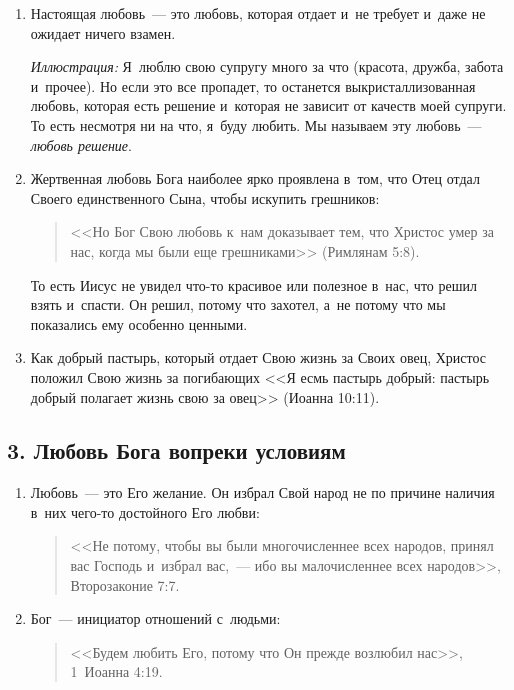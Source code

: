 \documentclass[a4paper,12pt]{article}
\begin{document}
\begin{enumerate}
    \item Настоящая любовь~--- это любовь, которая отдает и~не требует и~даже не ожидает ничего взамен.
    
    \emph{Иллюстрация:} Я~люблю свою супругу много за что (красота, дружба, забота и~прочее). Но если это все пропадет, то останется выкристаллизованная любовь, которая есть решение и~которая не зависит от качеств моей супруги. То есть несмотря ни на что, я~буду любить. Мы называем эту любовь~--- \emph{любовь решение}.
    
    \item Жертвенная любовь Бога наиболее ярко проявлена в~том, что Отец отдал Своего единственного Сына, чтобы искупить грешников:
    \begin{quote}
    <<Но Бог Свою любовь к~нам доказывает тем, что Христос умер за нас, когда мы были еще грешниками>> (Римлянам 5:8). 
    \end{quote}
    
    То есть Иисус не увидел что-то красивое или полезное в~нас, что решил взять и~спасти. Он решил, потому что захотел, а~не потому что мы показались ему особенно ценными.
    
    \item Как добрый пастырь, который отдает Свою жизнь за Своих овец, Христос положил Свою жизнь за погибающих <<Я есмь пастырь добрый: пастырь добрый полагает жизнь свою за овец>> (Иоанна 10:11).
\end{enumerate}

\subsection{3. Любовь Бога вопреки условиям}

\begin{enumerate}
    \item Любовь~--- это Его желание. Он избрал Свой народ не по причине наличия в~них чего-то достойного Его любви:
    \begin{quote}
    <<Не потому, чтобы вы были многочисленнее всех народов, принял вас Господь и~избрал вас,~--- ибо вы малочисленнее всех народов>>, Второзаконие 7:7.
    \end{quote}

    \item  Бог~--- инициатор отношений с~людьми:
    \begin{quote}
    <<Будем любить Его, потому что Он прежде возлюбил нас>>, 1~Иоанна 4:19. 
    \end{quote}

\end{enumerate}
\end{document}
